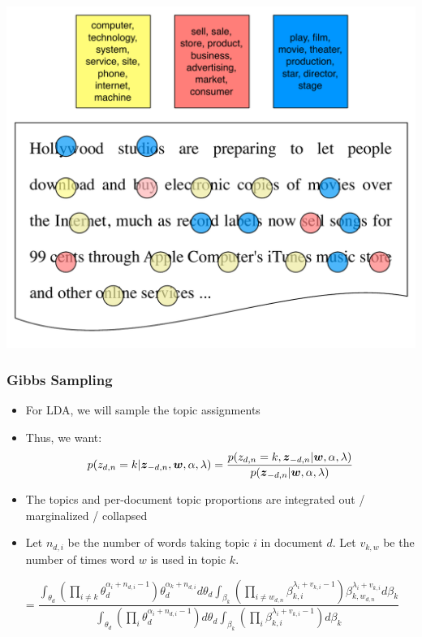 \documentclass[xcolor=dvipsnames]{beamer}
\newcommand{\bm}[1]{\mbox{\boldmath$#1$}}
\begin{document}
{\begin{center}
 {\includegraphics[width=.8\linewidth]{topic_models/inference_3}}
	\end{center}
}



\begin{frame}
\frametitle{Gibbs Sampling}
\begin{itemize}
\item For LDA, we will sample the topic assignments
\item Thus, we want:
\begin{equation*}
p(z_{d,n} = k | {\bm z}_{-d,n}, {\bm w}, \alpha, \lambda) = \frac{ p(z_{d,n} = k, {\bm z}_{-d,n} | {\bm w}, \alpha, \lambda)} { p({\bm z}_{-d,n} | {\bm w},\alpha, \lambda)}
\end{equation*}
\pause
\item The topics and per-document topic proportions are integrated out
  / marginalized / collapsed
\item Let $n_{d,i}$ be the number of words taking topic $i$ in document $d$.  Let $v_{k,w}$ be the number of times word $w$ is used in topic $k$.
\end{itemize}


\begin{equation*}
= \frac{ \int_{\theta_d} \left( \prod_{i \not = k} \theta_d^{\alpha_i + n_{d,i} - 1} \right)\theta_d^{\alpha_k + n_{d,i} } d\theta_d \int_{\beta_{k}}    \left( \prod_{i \not = w_{d,n}} \beta_{k,i} ^{ \lambda_i + v_{k,i} - 1} \right) \beta_{k, w_{d,n}}^{\lambda_i + v_{k,i}} d\beta_k } { \int_{\theta_d} \left( \prod_{i} \theta_d^{\alpha_i + n_{d,i} - 1} \right) d\theta_d \int_{\beta_{k}}    \left( \prod_{i} \beta_{k,i} ^{ \lambda_i + v_{k,i} - 1} \right) d\beta_k }
\end{equation*}
\end{frame}
\end{document}
